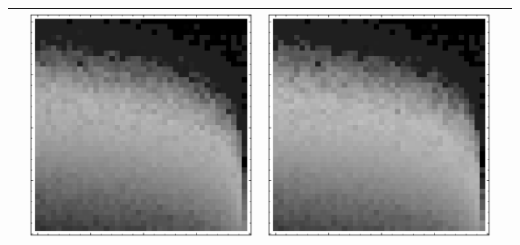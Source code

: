 \documentclass[10pt]{article}
\begin{document}
\begin{tabular}{|c|c|c|c|}
        & \includegraphics[scale=0.25]{plots/simple/LF-20T10T-20T10-CIFAR-2.eps}
        & \includegraphics[scale=0.25]{plots/simple/LF-20T10T-20T10-CIFAR-3.eps} \\ \hline

\end{tabular}
\end{document}
